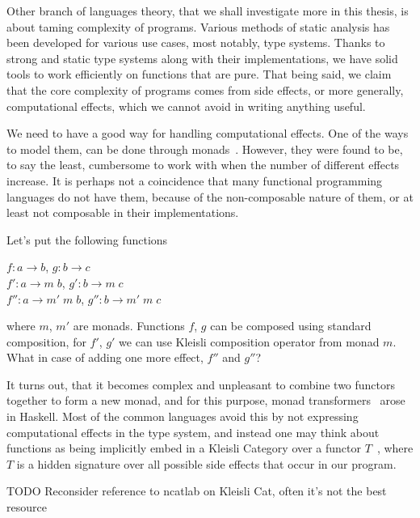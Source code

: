 \documentclass[declaration,shortabstract]{iithesis}
\theoremstyle{definition} \newtheorem{definition}{Definition}[chapter]
\theoremstyle{remark} \newtheorem{remark}[definition]{Observation}
\theoremstyle{plain} \newtheorem{theorem}[definition]{Theorem}
\theoremstyle{plain} \newtheorem{lemma}[definition]{Lemma}
\begin{document}
Other branch of languages theory, that we shall investigate more in this thesis,
is about taming complexity of programs. Various methods of static analysis has
been developed for various use cases, most notably, type systems. Thanks to strong
and static type systems along with their implementations, we have solid tools to
work efficiently on functions that are pure. That being said, we claim that the
core complexity of programs comes from side effects, or more generally, computational
effects, which we cannot avoid in writing anything useful.

We need to have a good way for handling computational effects. One of the ways
to model them, can be done through monads~\cite{monads-wadler, moggi}. However,
they were found to be, to say the least, cumbersome to work with when the number
of different effects increase. It is perhaps not a coincidence that many
functional programming languages do not have them, because of the non-composable
nature of them, or at least not composable in their implementations.

\noindent
Let's put the following functions

\begin{center}

    $ f: a \rightarrow b $, $ g : b \rightarrow c $ \\
    $ f': a \rightarrow m \; b $, $ g' : b \rightarrow m \; c $ \\
    $ f'': a \rightarrow m' \; m \; b $, $ g'' : b \rightarrow m' \; m \; c $ \\

\end{center}

\noindent
where $m$, $m'$ are monads. Functions $f$, $g$ can be composed using standard
composition, for $f'$, $g'$ we can use Kleisli composition operator from monad $m$.
What in case of adding one more effect, $f''$ and $g''$?

It turns out, that it becomes complex and unpleasant to combine two functors
together to form a new monad, and for this purpose, monad
transformers~\cite{monad-transformers} arose in Haskell. Most of the common
languages avoid this by not expressing computational effects in the type system,
and instead one may think about functions as being implicitly embed in a Kleisli
Category over a functor $T$~\cite{kleisli-ncatlab}, where $T$ is a hidden signature
over all possible side effects that occur in our program.

\noindent
TODO Reconsider reference to ncatlab on Kleisli Cat, often it's not the best resource
\end{document}
